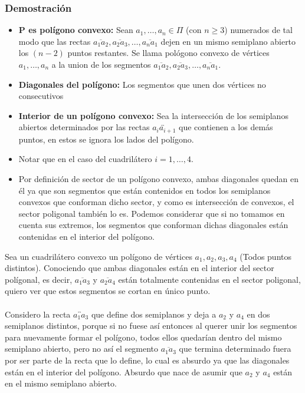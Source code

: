 \documentclass[a4paper]{article}
\begin{document}
\subsubsection{Demostración}
\begin{itemize}
    \item \textbf{P es polígono convexo:} Sean $a_1,\dots, a_n \in \Pi$ (con $n\geq 3$) numerados de tal modo que las rectas $\overline{a_1a_2}, \overline{a_2a_3}, \dots, \overline{a_na_1}$ dejen en un mismo semiplano abierto los $(n-2)$ puntos restantes. Se llama pológono convexo de vértices $a_1,\dots,a_n$ a la union de los segmentos $\overline{a_1a_2}, \overline{a_2a_3}, \dots, \overline{a_na_1}$.
    \item \textbf{Diagonales del polígono:} Los segmentos que unen dos vértices no consecutivos
    \item \textbf{Interior de un polígono convexo:} Sea la intersección de los semiplanos abiertos determinados por las rectas $\overleftrightarrow{a_ia_{i+1}}$ que contienen a los demás puntos, en estos se ignora los lados del polígono.
    \item Notar que en el caso del cuadrilátero $i=1,\dots,4$.
    \item Por definición de sector de un polígono convexo, ambas diagonales quedan en él ya que son segmentos que están contenidos en todos los semiplanos convexos que conforman dicho sector, y como es intersección de convexos, el sector poligonal también lo es. Podemos considerar que si no tomamos en cuenta sus extremos, los segmentos que conforman dichas diagonales están contenidas en el interior del polígono.
\end{itemize}
Sea un cuadrilátero convexo un polígono de vértices $a_1, a_2, a_3, a_4$ (Todos puntos distintos). Conociendo que ambas diagonales están en el interior del sector polígonal, es decir, $\overline{a_1a_3}$ y $\overline{a_2a_4}$ están totalmente contenidas en el sector poligonal, quiero ver que estos segmentos se cortan en único punto.\\\\
Considero la recta $\overleftrightarrow{a_1a_3}$ que define dos semiplanos y deja a $a_2$ y $a_4$ en dos semiplanos distintos, porque si no fuese así entonces al querer unir los segmentos para nuevamente formar el polígono, todos ellos quedarían dentro del mismo semiplano abierto, pero no así el segmento $\overline{a_1a_3}$ que termina determinado fuera por ser parte de la recta que lo define, lo cual es absurdo ya que las diagonales están en el interior del polígono. Absurdo que nace de asumir que $a_2$ y $a_4$ están en el mismo semiplano abierto. \\\\
\end{document}
